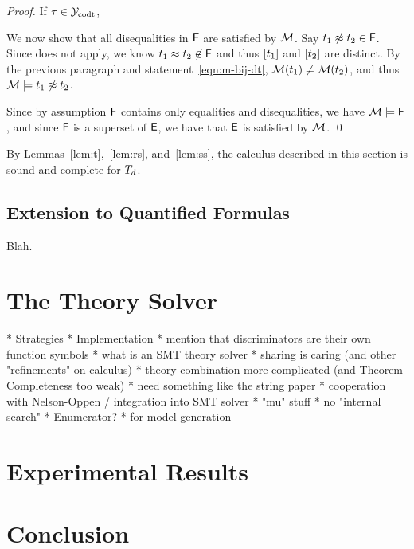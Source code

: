 \begin{proof}
If $\tau \in \mathcal{Y}_{\mathrm{codt}}$, 

We now show that all disequalities in $\mathsf{F}$ are satisfied by $\mathcal{M}$.
Say $t_1 \not\approx t_2 \in \mathsf{F}$.
Since  does not apply, we know $t_1 \approx t_2 \not\in \mathsf{F}$ and thus $[ t_1 ]$ and $[ t_2 ]$ are distinct.
By the previous paragraph and statement~\ref{eqn:m-bij-dt}, $\mathcal{M}( t_1 ) \neq \mathcal{M}( t_2 )$, and thus $\mathcal{M} \models t_1 \not\approx t_2$.

Since by assumption $\mathsf{F}$ contains only equalities and disequalities, we have $\mathcal{M} \models \mathsf{F}$,
and since $\mathsf{F}$ is a superset of $\mathsf{E}$, we have that $\mathsf{E}$ is satisfied by $\mathcal{M}$.
\qed
\end{proof}

By Lemmas~\ref{lem:t},~\ref{lem:rs}, and~\ref{lem:ss}, the calculus described in this section is sound and complete for $T_{d}$.

\subsection{Extension to Quantified Formulas}

Blah.

\section{The Theory Solver}
\label{sec:the-theory-solver}

  * Strategies
  * Implementation
    * mention that discriminators are their own function symbols
    * what is an SMT theory solver
    * sharing is caring (and other "refinements" on calculus)
    * theory combination more complicated (and Theorem Completeness too weak)
      * need something like the string paper
    * cooperation with Nelson-Oppen / integration into SMT solver
    * "mu" stuff
    * no "internal search"
  * Enumerator?
    * for model generation


\section{Experimental Results}
\label{sec:experimental-results}


\section{Conclusion}
\label{sec:conclusion}

